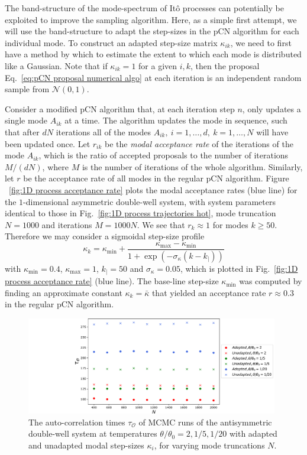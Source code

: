 The band-structure of the mode-spectrum of It\^{o} processes can potentially be exploited to improve the sampling algorithm. Here, as a simple first attempt, we will use the band-structure to adapt the step-sizes in the pCN algorithm for each individual mode. To construct an adapted step-size matrix $\kappa_{ik}$, we need to first have a method by which to estimate the extent to which each mode is distributed like a Gaussian. Note that if $\kappa_{ik} = 1$ for a given $i,k$, then the proposal Eq.~\ref{eq:pCN proposal numerical algo} at each iteration is an independent random sample from $\mathcal{N}(0,1)$.

Consider a modified pCN algorithm that, at each iteration step $n$, only updates a single mode $A_{ik}$ at a time. The algorithm updates the mode in sequence, such that after $d N$ iterations all of the modes $A_{ik},\ i=1,\dots,d,\ k=1,\dots,N$ will have been updated once. Let $r_{ik}$ be the \textit{modal acceptance rate} of the iterations of the mode $A_{ik}$, which is the ratio of accepted proposals to the number of iterations $M/(dN)$, where $M$ is the number of iterations of the whole algorithm. Similarly, let $r$ be the acceptance rate of all modes in the regular pCN algorithm. Figure ~\ref{fig:1D process acceptance rate} plots the modal acceptance rates (blue line) for the $1$-dimensional asymmetric double-well system, with system parameters identical to those in Fig.~\ref{fig:1D process trajectories hot}, mode truncation $N = 1000$ and iterations $M = 1000N$. We see that $r_k \approx 1$ for modes $k \geq 50$. Therefore we may consider a sigmoidal step-size profile
\begin{equation} \label{eq:kappa profile}
	\kappa_k = \kappa_\text{min} + \frac{\kappa_\text{max} - \kappa_\text{min}}{1 + \exp\left( - \sigma_\kappa ( k - k_|) \right)}
\end{equation}
with $\kappa_\text{min} = 0.4$, $\kappa_\text{max}=1$, $k_| = 50$ and $\sigma_\kappa = 0.05$, which is plotted in Fig.~\ref{fig:1D process acceptance rate} (blue line). The base-line step-size $\kappa_\text{min}$ was computed by finding an approximate constant $\kappa_{k} = \bar{\kappa}$ that yielded an acceptance rate $r \approx 0.3$ in the regular pCN algorithm.

\begin{figure}[t]
\includegraphics[width=0.98\textwidth]{figs_part1/mcmc/autocorrelation_benchmarks}
\centering \caption{ The auto-correlation times $\tau_{\mathcal{O}}$ of MCMC runs of the antisymmetric double-well system at temperatures $\theta/\theta_0 = 2, 1/5,1/20$ with adapted and unadapted modal step-sizes $\kappa_i$, for varying mode truncations $N$.}
\label{fig:1D autocorrelation benchmarks} 
\end{figure}


